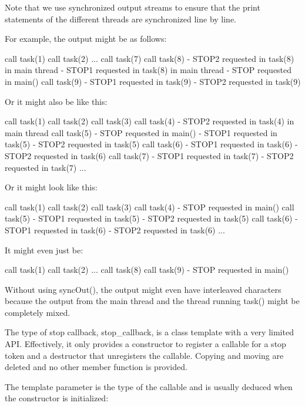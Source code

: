 Note that we use synchronized output streams to ensure that the print statements of the different threads are synchronized line by line.

For example, the output might be as follows:

\begin{shell}
call task(1)
call task(2)
...
call task(7)
call task(8)
- STOP2 requested in task(8) in main thread
- STOP1 requested in task(8) in main thread
- STOP requested in main()
call task(9)
- STOP1 requested in task(9)
- STOP2 requested in task(9)
\end{shell}


Or it might also be like this:

\begin{shell}
call task(1)
call task(2)
call task(3)
call task(4)
- STOP2 requested in task(4) in main thread
call task(5)
- STOP requested in main()
- STOP1 requested in task(5)
- STOP2 requested in task(5)
call task(6)
- STOP1 requested in task(6)
- STOP2 requested in task(6)
call task(7)
- STOP1 requested in task(7)
- STOP2 requested in task(7)
...
\end{shell}

Or it might look like this:

\begin{shell}
call task(1)
call task(2)
call task(3)
call task(4)
- STOP requested in main()
call task(5)
- STOP1 requested in task(5)
- STOP2 requested in task(5)
call task(6)
- STOP1 requested in task(6)
- STOP2 requested in task(6)
...
\end{shell}

It might even just be:

\begin{shell}
call task(1)
call task(2)
...
call task(8)
call task(9)
- STOP requested in main()
\end{shell}

Without using syncOut(), the output might even have interleaved characters because the output from the main thread and the thread running task() might be completely mixed.


The type of stop callback, stop\_callback, is a class template with a very limited API. Effectively, it only provides a constructor to register a callable for a stop token and a destructor that unregisters the callable. Copying and moving are deleted and no other member function is provided.

The template parameter is the type of the callable and is usually deduced when the constructor is initialized:

